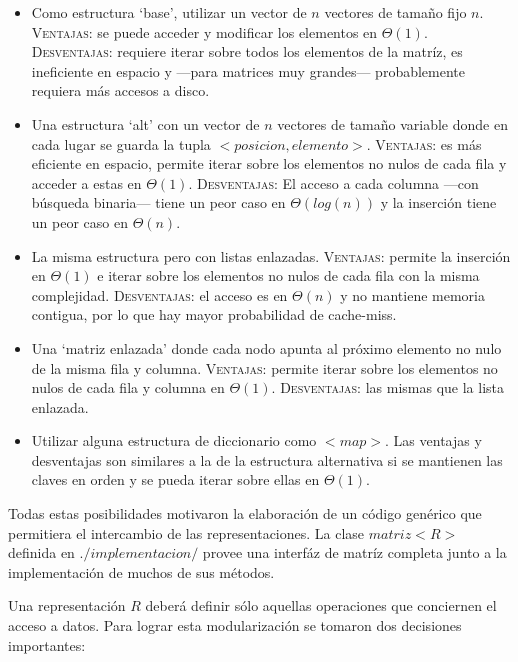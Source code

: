 \vspace{1em}
\begin{itemize}
    \item Como estructura `base', utilizar un vector de $n$ vectores de tamaño fijo $n$. \textsc{Ventajas}: se puede acceder y modificar los elementos en $\Theta(1)$. \textsc{Desventajas}: requiere iterar sobre todos los elementos de la matríz, es ineficiente en espacio y ---para matrices muy grandes--- probablemente requiera más accesos a disco.\\
    \item Una estructura `alt' con un vector de $n$ vectores de tamaño variable donde en cada lugar se guarda la tupla $<posicion, elemento>$. \textsc{Ventajas}: es más eficiente en espacio, permite iterar sobre los elementos no nulos de cada fila y acceder a estas en $\Theta(1)$. \textsc{Desventajas}: El acceso a cada columna ---con búsqueda binaria--- tiene un peor caso en $\Theta(log(n))$ y la inserción tiene un peor caso en $\Theta(n)$.\\
    \item La misma estructura pero con listas enlazadas. \textsc{Ventajas}: permite la inserción en $\Theta(1)$ e iterar sobre los elementos no nulos de cada fila con la misma complejidad. \textsc{Desventajas}: el acceso es en $\Theta(n)$ y no mantiene memoria contigua, por lo que hay mayor probabilidad de cache-miss.\\
    \item Una `matriz enlazada' donde cada nodo apunta al próximo elemento no nulo de la misma fila y columna. \textsc{Ventajas}: permite iterar sobre los elementos no nulos de cada fila y columna en $\Theta(1)$. \textsc{Desventajas}: las mismas que la lista enlazada.\\
    \item Utilizar alguna estructura de diccionario como $<map>$. Las ventajas y desventajas son similares a la de la estructura alternativa si se mantienen las claves en orden y se pueda iterar sobre ellas en $\Theta(1)$.   
\end{itemize}

\vspace{1em}
Todas estas posibilidades motivaron la elaboración de un código genérico que permitiera el intercambio de las representaciones. La clase $matriz<R>$ definida en $./implementacion/$ provee una interfáz de matríz completa junto a la implementación de muchos de sus métodos. 

Una representación $R$ deberá definir sólo aquellas operaciones que conciernen el acceso a datos. Para lograr esta modularización se tomaron dos decisiones importantes:

